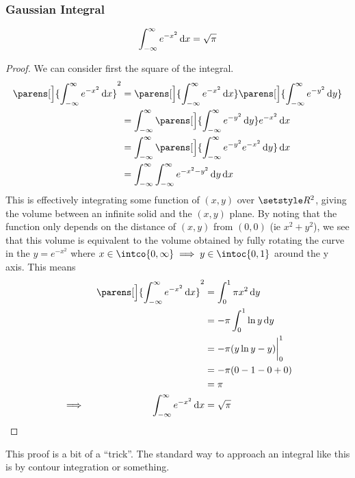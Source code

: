 \subsubsection{Gaussian Integral}

\begin{theorem} \label{thm_gauss_integral}
 \begin{equation*}
  \integ[-\infty]<\infty>{e^{-x^2}}{x} = \sqrt \pi
 \end{equation*}
\end{theorem}
\begin{proof}
 We can consider first the square of the integral.
 \begin{align*}
  \parens[\Big]{\integ[-\infty]<\infty>{e^{-x^2}}{x}}^2
  &= \parens[\Big]{\integ[-\infty]<\infty>{e^{-x^2}}{x}}
     \parens[\Big]{\integ[-\infty]<\infty>{e^{-y^2}}{y}} \\
  &= \integ[-\infty]<\infty>{
                 \parens[\Big]{\integ[-\infty]<\infty>{e^{-y^2}}{y}}
             e^{-x^2}}{x} \\
  &= \integ[-\infty]<\infty>{
         \parens[\Big]{\integ[-\infty]<\infty>{e^{-y^2} e^{-x^2}}{y}}}{x} \\
  &= \integ[-\infty]<\infty>{
         \integ[-\infty]<\infty>{e^{-x^2-y^2}}{y}}{x}
 \end{align*}
 This is effectively integrating some function of \((x, y)\) over
 \(\Reals^2\), giving the volume between an infinite solid and the \((x, y)\)
 plane. By noting that the function only depends on the distance of
 \((x, y)\) from \((0, 0)\) (ie \(x^2 + y^2\)), we see that this volume is
 equivalent to the volume obtained by fully rotating the curve in the
 \(y = e^{-x^2}\) where
 \(x \in \intco{0, \infty} \implies y \in \intoc{0, 1}\) around the y axis.
 This means
 \begin{alignat*}{2}
  && \parens[\Big]{\integ[-\infty]<\infty>{e^{-x^2}}{x}}^2
      &= \integ[0]<1>{\pi x^2}{y} \\
  &&  &= -\pi \integ[0]<1>{\ln y}{y} \\
  &&  &= -\pi (y\ln y - y)\eval_0^1 \\
  &&  &= -\pi (0 - 1 - 0 + 0) \\
  &&  &= \pi \\
  \implies{}&& \integ[-\infty]<\infty>{e^{-x^2}}{x}
      &= \sqrt \pi \qedhere
 \end{alignat*}
\end{proof}
This proof is a bit of a ``trick''. The standard way to approach an integral
like this is by contour integration or something.

